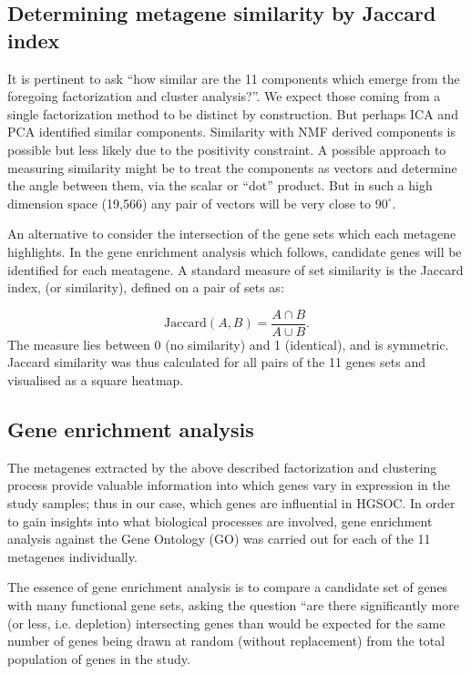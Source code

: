 \documentclass[draft,tikz, 12pt,a4paper,oneside,fleqn]{article}
\begin{document}
\subsection{Determining metagene similarity by Jaccard index}

It is pertinent to ask ``how similar are the 11 components which emerge from the foregoing factorization and cluster analysis?''.  We expect those coming from a single factorization method to be distinct by construction.  But perhaps ICA and PCA identified similar components.  Similarity with NMF derived components is possible but less likely due to the positivity constraint.  A possible approach to measuring similarity might be to treat the components as vectors and determine the angle between them, via the scalar or ``dot'' product.  But in such a high dimension space (19,566) any pair of vectors will be very close to $90^\circ$.

An alternative to consider the intersection of the gene sets which each metagene highlights.  In the gene enrichment analysis which follows, candidate genes will be identified for each meatagene.  A standard measure of set similarity is the Jaccard index, (or similarity), defined on a pair of sets as:

\[
   \mbox{Jaccard}(A, B) = \frac{A \cap B}{A \cup B}.
\]
The measure lies between 0 (no similarity) and 1 (identical), and is symmetric.  Jaccard similarity was thus calculated for all pairs of the 11 genes sets and visualised as a square heatmap.
	   	  
\subsection{Gene enrichment analysis}

The metagenes extracted by the above described factorization and clustering process provide valuable information into which genes vary in expression in the study samples; thus in our case, which genes are influential in HGSOC.  
In order to gain insights into what biological processes are involved, gene enrichment analysis against the Gene Ontology (GO) was carried out for each of the 11 metagenes individually.

The essence of gene enrichment analysis is to compare a candidate set of genes with many functional gene sets, asking the question ``are there significantly more (or less, i.e. depletion) intersecting genes than would be expected for the same number of genes being drawn at random (without replacement) from the total population of genes in the study. 
\end{document}
